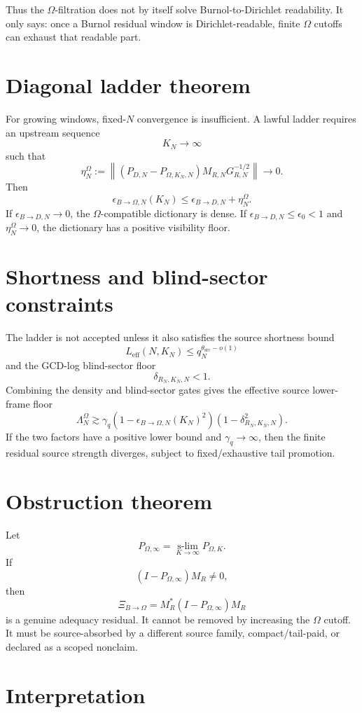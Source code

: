 \documentclass[11pt]{article}
\begin{document}
Thus the $\Omega$-filtration does not by itself solve Burnol-to-Dirichlet readability.
It only says: once a Burnol residual window is Dirichlet-readable, finite $\Omega$ cutoffs can
exhaust that readable part.

\section{Diagonal ladder theorem}

For growing windows, fixed-$N$ convergence is insufficient.  A lawful ladder requires an upstream
sequence
\[
K_N\to\infty
\]
such that
\[
\eta_N^{\Omega}
:=
\left\|(P_{D,N}-P_{\Omega,K_N,N})M_{R,N}G_{R,N}^{-1/2}\right\|\to0.
\]
Then
\[
\epsilon_{B\to\Omega,N}(K_N)
\le
\epsilon_{B\to D,N}+\eta_N^\Omega.
\]
If $\epsilon_{B\to D,N}\to0$, the $\Omega$-compatible dictionary is dense.
If $\epsilon_{B\to D,N}\le\epsilon_0<1$ and $\eta_N^\Omega\to0$, the dictionary has a positive
visibility floor.

\section{Shortness and blind-sector constraints}

The ladder is not accepted unless it also satisfies the source shortness bound
\[
L_{\mathrm{eff}}(N,K_N)\le q_N^{\theta_{\mathrm{src}}-o(1)}
\]
and the GCD-log blind-sector floor
\[
\delta_{R_N,K_N,N}<1.
\]
Combining the density and blind-sector gates gives the effective source lower-frame floor
\[
\Lambda_N^\Omega
\gtrsim
\gamma_q
\left(1-\epsilon_{B\to\Omega,N}(K_N)^2\right)
\left(1-\delta_{R_N,K_N,N}^{2}\right).
\]
If the two factors have a positive lower bound and $\gamma_q\to\infty$, then the finite residual
source strength diverges, subject to fixed/exhaustive tail promotion.

\section{Obstruction theorem}

Let
\[
P_{\Omega,\infty}
=
\operatorname*{s-lim}_{K\to\infty}P_{\Omega,K}.
\]
If
\[
(I-P_{\Omega,\infty})M_R\ne0,
\]
then
\[
\Xi_{B\to\Omega}
=
M_R^{*}(I-P_{\Omega,\infty})M_R
\]
is a genuine adequacy residual.  It cannot be removed by increasing the $\Omega$ cutoff.
It must be source-absorbed by a different source family, compact/tail-paid, or declared as a scoped
nonclaim.

\section{Interpretation}
\end{document}
